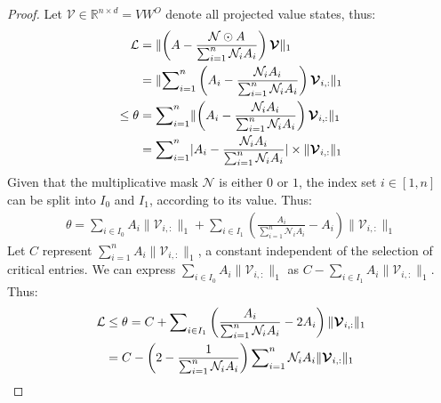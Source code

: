 \begin{proof}
	Let $\boldsymbol{\mathcal{V}} \in \mathbb{R}^{n \times d} = VW^O$ denote all projected value states, thus:
	{\small
		\begin{align}
        \mathcal{L} &= \lVert \left(A - \frac{\mathcal{N} \odot A}{\sum\nolimits_{i=1}^{n} \mathcal{N}_i A_{i}}\right)\boldsymbol{\mathcal{V}}\rVert_1 \\
                    &= \lVert \sum\nolimits_{i=1}^{n} \left(A_i -  \frac{\mathcal{N}_i A_i}{\sum\nolimits_{i=1}^{n} \mathcal{N}_i A_{i}} \right) \boldsymbol{\mathcal{V}}_{i,:}\rVert_1 \notag \\
        \leq \theta &= \sum\nolimits_{i=1}^{n} \lVert \left(A_i -  \frac{\mathcal{N}_i A_i}{\sum\nolimits_{i=1}^{n} \mathcal{N}_i A_{i}}\right) \boldsymbol{\mathcal{V}}_{i,:}\rVert_1 \\
                    &= \sum\nolimits_{i=1}^{n} \lvert A_i -  \frac{\mathcal{N}_i A_i}{\sum\nolimits_{i=1}^{n} \mathcal{N}_i A_{i}} \rvert \times \lVert  \boldsymbol{\mathcal{V}}_{i,:} \rVert_1 \notag
	\end{align}
	}
Given that the multiplicative mask $\mathcal{N}$ is either $0$ or $1$, the index set $i \in [1,n]$ can be split into  $I_0$ and $I_1$, according to its value. Thus:
{\small
	\begin{align}
	 \theta =  \sum\nolimits_{i \in I_0} A_i \lVert \boldsymbol{\mathcal{V}}_{i,:} \rVert_1 + \sum\nolimits_{i \in I_1} \left(  \frac{ A_i}{\sum\nolimits_{i=1}^{n} \mathcal{N}_i A_{i}} - A_i \right) \lVert \boldsymbol{\mathcal{V}}_{i,:} \rVert_1
\end{align}
}
	Let $C$ represent $\sum\nolimits_{i=1}^{n} A_i \lVert \boldsymbol{\mathcal{V}}_{i,:} \rVert_1$, a constant independent of the selection of critical entries. We can express $\sum\nolimits_{i \in I_0} A_i \lVert \boldsymbol{\mathcal{V}}_{i,:}\rVert_1$ as $C - \sum\nolimits_{i \in I_1} A_i \lVert \boldsymbol{\mathcal{V}}_{i,:} \rVert_1$. Thus:
	{\small
		\begin{align}
		\mathcal{L} &\leq \theta = C + \sum\nolimits_{i \in I_1}  \left(  \frac{ A_i}{\sum\nolimits_{i=1}^{n} \mathcal{N}_i A_{i}} - 2A_i \right) \lVert \boldsymbol{\mathcal{V}}_{i,:} \rVert_1 \\
            &= C -  \left(2- \frac{1}{\sum\nolimits_{i=1}^{n} \mathcal{N}_i A_{i}} \right) \sum\nolimits_{i=1}^{n}  \mathcal{N}_i A_i \lVert \boldsymbol{\mathcal{V}}_{i,:} \rVert_1 \notag
	\end{align}
	}
\end{proof}
